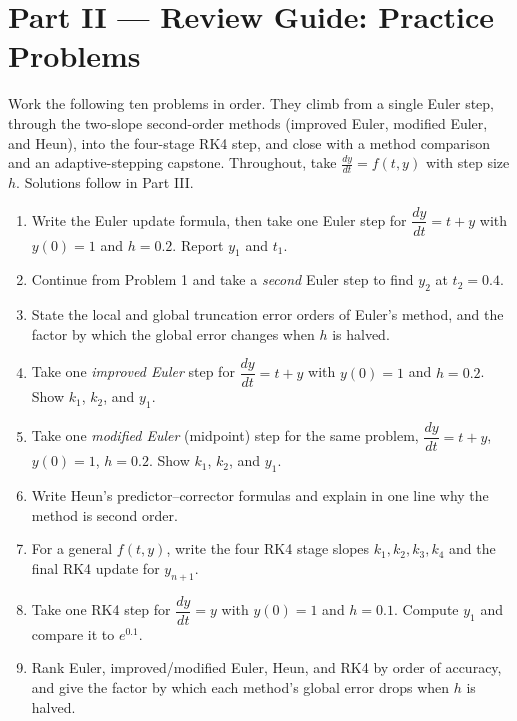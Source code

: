 \section*{Part II --- Review Guide: Practice Problems}

Work the following ten problems in order. They climb from a single Euler step,
through the two-slope second-order methods (improved Euler, modified Euler, and
Heun), into the four-stage RK4 step, and close with a method comparison and an
adaptive-stepping capstone. Throughout, take $\frac{dy}{dt}=f(t,y)$ with step
size $h$. Solutions follow in Part III.

\begin{enumerate}[leftmargin=2em]
    \item Write the Euler update formula, then take one Euler step for
          $\dfrac{dy}{dt} = t + y$ with $y(0) = 1$ and $h = 0.2$. Report $y_1$
          and $t_1$.

    \item Continue from Problem 1 and take a \emph{second} Euler step to find
          $y_2$ at $t_2 = 0.4$.

    \item State the local and global truncation error orders of Euler's method,
          and the factor by which the global error changes when $h$ is halved.

    \item Take one \emph{improved Euler} step for $\dfrac{dy}{dt} = t + y$ with
          $y(0) = 1$ and $h = 0.2$. Show $k_1$, $k_2$, and $y_1$.

    \item Take one \emph{modified Euler} (midpoint) step for the same problem,
          $\dfrac{dy}{dt} = t + y$, $y(0)=1$, $h = 0.2$. Show $k_1$, $k_2$, and
          $y_1$.

    \item Write Heun's predictor--corrector formulas and explain in one line why
          the method is second order.

    \item For a general $f(t,y)$, write the four RK4 stage slopes
          $k_1,k_2,k_3,k_4$ and the final RK4 update for $y_{n+1}$.

    \item Take one RK4 step for $\dfrac{dy}{dt} = y$ with $y(0) = 1$ and
          $h = 0.1$. Compute $y_1$ and compare it to $e^{0.1}$.

    \item Rank Euler, improved/modified Euler, Heun, and RK4 by order of
          accuracy, and give the factor by which each method's global error
          drops when $h$ is halved.


\end{enumerate}
